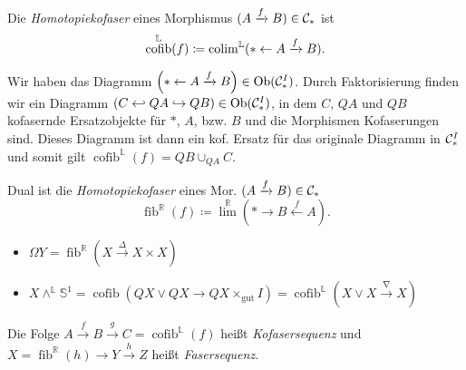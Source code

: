 \documentclass{cheat-sheet}
\newcommand{\gut}{\text{gut}}
\newcommand{\gutCyl}[1]{#1 \!\times_\gut\! I} %
\newcommand{\LL}{\mathbb{L}} %
\newcommand{\RR}{\mathbb{R}} %
\DeclareMathOperator{\fib}{fib} %
\DeclareMathOperator{\cofib}{cofib} %
\newcommand{\Sph}{\mathds{S}} %
\begin{document}
\begin{defn}
  Die \emph{Homotopiekofaser} eines Morphismus $(A \xrightarrow{f} B) \in \mathcal{C}_*$ ist
  \[ \cofib^\LL(f) \coloneqq \colim^\LL(* \leftarrow A \xrightarrow{f} B). \]
\end{defn}

\begin{konstr}
  Wir haben das Diagramm $\left( * \leftarrow A \xrightarrow{f} B \right) \in \operatorname{Ob}(\mathcal{C}_*^I)$.
  Durch Faktorisierung finden wir ein Diagramm $\left( C \hookleftarrow{} QA \hookrightarrow QB \right) \in \operatorname{Ob}(\mathcal{C}_*^I)$, in dem $C$, $QA$ und $QB$ kofasernde Ersatzobjekte für $*$, $A$, bzw. $B$ und die Morphismen Kofaserungen sind.
  Dieses Diagramm ist dann ein kof. Ersatz für das originale Diagramm in $\mathcal{C}_*^I$ und somit gilt $\cofib^\LL(f) = QB \cup_{QA} C$.
\end{konstr}

\begin{defn}
  Dual ist die \emph{Homotopiekofaser} eines Mor. $(A \xrightarrow{f} B) \in \mathcal{C}_*$
  \[ \fib^\RR(f) \coloneqq \lim^\RR(* \to B \xleftarrow{f} A). \]
\end{defn}

\begin{bspe}
  \begin{itemize}
    \item $\Omega Y = \fib^\RR(X \xrightarrow{\Delta} X \times X)$
    \item $X \wedge^\LL \Sph^1 = \cofib(QX \vee QX \to \gutCyl{QX}) = \cofib^\LL(X \vee X \xrightarrow{\nabla} X)$
  \end{itemize}
\end{bspe}

\begin{defn}
  Die Folge $A \xrightarrow{f} B \xrightarrow{g} C = \cofib^\LL(f)$ heißt \emph{Kofasersequenz}
  und $X = \fib^\RR(h) \to Y \xrightarrow{h} Z$ heißt \emph{Fasersequenz}.
\end{defn}
\end{document}
